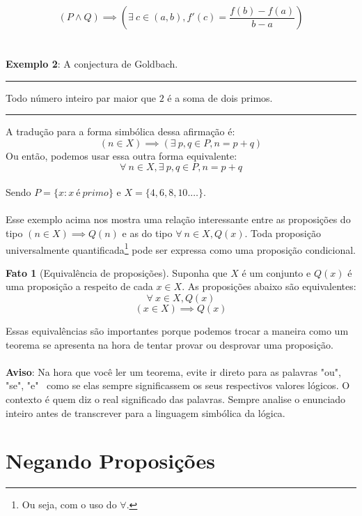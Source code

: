 \documentclass[a4paper,11pt]{book}
\theoremstyle{definition}
\theoremstyle{break}
\newtheorem{fact}{Fato}[section]
\begin{document}
$$ \left( P \land Q \right) \implies \left(\exists \ c \in (a,b), f'(c) = \dfrac{f(b) - f(a)}{b - a} \right) $$
\\
\\
\textbf{Exemplo 2}: A conjectura de Goldbach.
\\
\hrule
\vspace{5pt}
Todo número inteiro par maior que $2$ é a soma de dois primos.
\vspace{5pt}
\hrule
\vspace{5pt}
A tradução para a forma simbólica dessa afirmação é:
$$ \left( n \in X \right) \implies \left( \exists \ p,q \in P, n = p + q \right) $$
Ou então, podemos usar essa outra forma equivalente:
$$ \forall \ n \in X, \exists \ p,q \in P, n = p + q $$
\\
Sendo $P = \{x : x \ é \ primo \}$ e $X = \{ 4,6,8,10.\dots \}$. 
\\
\\
Esse exemplo acima nos mostra uma relação interessante entre as proposições do tipo $(n \in X) \implies Q(n)$ e as do tipo $\forall \ n \in X, Q(x)$. Toda proposição universalmente quantificada\footnote{Ou seja, com o uso do $\forall$.} pode ser expressa como uma proposição condicional.


\begin{fact}[Equivalência de proposições]
Suponha que $X$ é um conjunto e $Q(x)$ é uma proposição a respeito de cada $x \in X$. As proposições abaixo são equivalentes:
$$ \forall \ x \in X, Q(x) $$
$$ (x \in X) \implies Q(x) $$
\end{fact}

Essas equivalências são importantes porque podemos trocar a maneira como um teorema se apresenta na hora de tentar provar ou desprovar uma proposição.
\\
\\
\textbf{Aviso}: Na hora que você ler um teorema, evite ir direto para as palavras "ou", "se", "e" \ como se elas sempre significassem os seus respectivos valores lógicos. O contexto é quem diz o real significado das palavras. Sempre analise o enunciado inteiro antes de transcrever para a linguagem simbólica da lógica.

\section{Negando Proposições}
\end{document}
